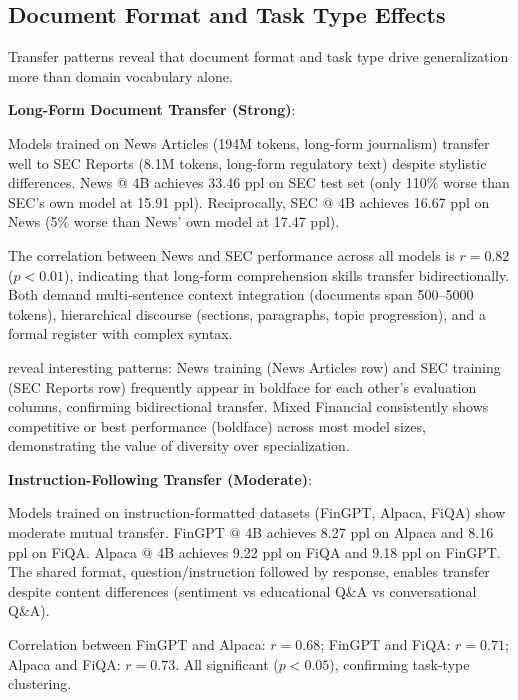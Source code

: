 \subsection{Document Format and Task Type Effects}

Transfer patterns reveal that document format and task type drive generalization more than domain vocabulary alone.

\textbf{Long-Form Document Transfer (Strong)}:

Models trained on News Articles (194M tokens, long-form journalism) transfer well to SEC Reports (8.1M tokens, long-form regulatory text) despite stylistic differences. News @ 4B achieves 33.46 ppl on SEC test set (only 110\% worse than SEC's own model at 15.91 ppl). Reciprocally, SEC @ 4B achieves 16.67 ppl on News (5\% worse than News' own model at 17.47 ppl).

The correlation between News and SEC performance across all models is $r = 0.82$ ($p < 0.01$), indicating that long-form comprehension skills transfer bidirectionally. Both demand multi‑sentence context integration (documents span 500–5000 tokens), hierarchical discourse (sections, paragraphs, topic progression), and a formal register with complex syntax.





 reveal interesting patterns: News training (News Articles row) and SEC training (SEC Reports row) frequently appear in boldface for each other's evaluation columns, confirming bidirectional transfer. Mixed Financial consistently shows competitive or best performance (boldface) across most model sizes, demonstrating the value of diversity over specialization.

\textbf{Instruction-Following Transfer (Moderate)}:

Models trained on instruction-formatted datasets (FinGPT, Alpaca, FiQA) show moderate mutual transfer. FinGPT @ 4B achieves 8.27 ppl on Alpaca and 8.16 ppl on FiQA. Alpaca @ 4B achieves 9.22 ppl on FiQA and 9.18 ppl on FinGPT. The shared format, question/instruction followed by response, enables transfer despite content differences (sentiment vs educational Q\&A vs conversational Q\&A).

Correlation between FinGPT and Alpaca: $r = 0.68$; FinGPT and FiQA: $r = 0.71$; Alpaca and FiQA: $r = 0.73$. All significant ($p < 0.05$), confirming task-type clustering.

